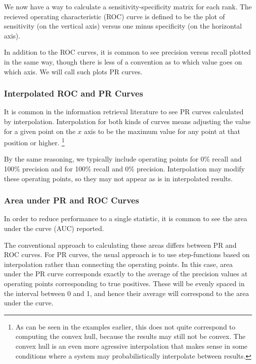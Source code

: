 We now have a way to calculate a sensitivity-specificity matrix for
each rank.  The recieved operating characteristic (ROC) curve is
defined to be the plot of sensitivity (on the vertical axis) versus
one minus specificity (on the horizontal axis).

In addition to the ROC curves, it is common to see precision versus
recall plotted in the same way, though there is less of a convention
as to which value goes on which axis.  We will call such plots PR
curves.

\subsubsection{Interpolated ROC and PR Curves}

It is common in the information retrieval literature to see PR curves
calculated by interpolation.  Interpolation for both kinds of
curves means adjusting the value for a given point on the $x$ axis
to be the maximum value for any point at that position or higher.%
%
\footnote{As can be seen in the examples earlier, this does not quite
  correspond to computing the convex hull, because the results may
  still not be convex.  The convex hull is an even more agressive
  interpolation that makes sense in some conditions where a system
  may probabilistically interpolate between results.}

By the same reasoning, we typically include operating points for 0\%
recall and 100\% precision and for 100\% recall and 0\% precision.
Interpolation may modify these operating points, so they may not
appear as is in interpolated results.


\subsubsection{Area under PR and ROC Curves}

In order to reduce performance to a single statistic, it is common to
see the area under the curve (AUC) reported.  

The conventional approach to calculating these areas differs between
PR and ROC curves.  For PR curves, the usual approach is to use
step-functions based on interpolation rather than connecting the
operating points.  In this case, area under the PR curve corresponds
exactly to the average of the precision values at operating points
corresponding to true positives.  These will be evenly spaced in the
interval between 0 and 1, and hence their average will correspond to
the area under the curve.

